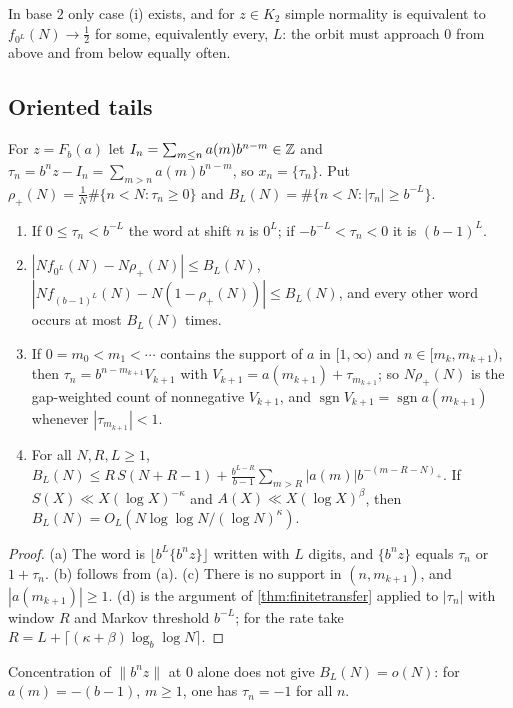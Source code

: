 \documentclass[11pt]{article}
\DeclareMathOperator{\sgn}{sgn}
\newcommand{\dist}[1]{\lVert #1\rVert}
\newcommand{\fr}[1]{\{#1\}}
\newcommand{\cnt}{\#}
\begin{document}
In base $2$ only case (i) exists, and for $z\in K_2$ simple normality is equivalent to
$f_{0^L}(N)\to\frac12$ for some, equivalently every, $L$: the orbit must approach $0$ from above and
from below equally often.

\subsection{Oriented tails}\label{subsec:oriented}

For $z=F_b(a)$ let $I_n=\sum_{m\le n}a(m)b^{n-m}\in\mathbb Z$ and $\tau_n=b^nz-I_n=\sum_{m>n}a(m)b^{n-m}$,
so $x_n=\fr{\tau_n}$. Put $\rho_+(N)=\frac1N\cnt\{n<N:\tau_n\ge0\}$ and
$B_L(N)=\cnt\{n<N:|\tau_n|\ge b^{-L}\}$.

\begin{lemma}\label{lem:oriented}
\leavevmode
\begin{enumerate}[label=\textup{(\alph*)},nosep]
\item If $0\le\tau_n<b^{-L}$ the word at shift $n$ is $0^L$; if $-b^{-L}<\tau_n<0$ it is $(b-1)^L$.
\item $|Nf_{0^L}(N)-N\rho_+(N)|\le B_L(N)$, $|Nf_{(b-1)^L}(N)-N(1-\rho_+(N))|\le B_L(N)$, and every
other word occurs at most $B_L(N)$ times.
\item If $0=m_0<m_1<\cdots$ contains the support of $a$ in $[1,\infty)$ and $n\in[m_k,m_{k+1})$, then
$\tau_n=b^{n-m_{k+1}}V_{k+1}$ with $V_{k+1}=a(m_{k+1})+\tau_{m_{k+1}}$; so
$N\rho_+(N)$ is the gap-weighted count of nonnegative $V_{k+1}$, and $\sgn V_{k+1}=\sgn a(m_{k+1})$
whenever $|\tau_{m_{k+1}}|<1$.
\item For all $N,R,L\ge1$,
$B_L(N)\le R\,S(N+R-1)+\frac{b^{L-R}}{b-1}\sum_{m>R}|a(m)|b^{-(m-R-N)_+}$. If
$S(X)\ll X(\log X)^{-\kappa}$ and $A(X)\ll X(\log X)^\beta$, then
$B_L(N)=O_L(N\log\log N/(\log N)^\kappa)$.
\end{enumerate}
\end{lemma}

\begin{proof}
(a) The word is $\lfloor b^L\fr{b^nz}\rfloor$ written with $L$ digits, and $\fr{b^nz}$ equals
$\tau_n$ or $1+\tau_n$. (b) follows from (a). (c) There is no support in $(n,m_{k+1})$, and
$|a(m_{k+1})|\ge1$. (d) is the argument of \cref{thm:finitetransfer} applied to $|\tau_n|$ with
window $R$ and Markov threshold $b^{-L}$; for the rate take $R=L+\lceil(\kappa+\beta)\log_b\log N\rceil$.
\end{proof}

Concentration of $\dist{b^nz}$ at $0$ alone does not give $B_L(N)=o(N)$: for $a(m)=-(b-1)$,
$m\ge1$, one has $\tau_n=-1$ for all $n$.
\end{document}

